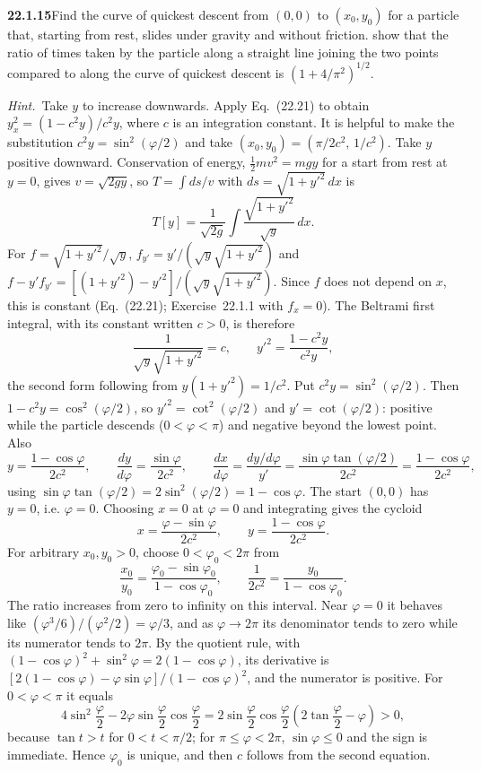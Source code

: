 \par\bigskip
\noindent\textbf{22.1.15}\quad Find the curve of quickest descent
from $(0,0)$ to $(x_{0},y_{0})$ for a particle that, starting
from rest, slides under gravity and without friction.
  show that
the ratio of times taken by the particle along a straight line
joining the two points compared to along the curve of quickest
descent is $(1+4/\pi^{2})^{1/2}$.
\par\emph{Hint.}~Take $y$ to increase downwards. Apply
Eq.~(22.21) to obtain $y_{x}^{2}=(1-c^{2}y)/c^{2}y$, where $c$ is
an integration constant. It is helpful to make the substitution
$c^{2}y=\sin^{2}(\varphi/2)$ and take
$(x_{0},y_{0})=(\pi/2c^{2},\,1/c^{2})$.
\solution
Take $y$ positive downward. Conservation of energy,
$\tfrac12mv^2=mgy$ for a start from rest at $y=0$, gives
$v=\sqrt{2gy}$, so $T=\int ds/v$ with $ds=\sqrt{1+y'^2}\,dx$ is
\[
T[y]=\frac1{\sqrt{2g}}\int
\frac{\sqrt{1+y'^2}}{\sqrt y}\,dx.
\]
For $f=\sqrt{1+y'^2}/\sqrt y$, $f_{y'}=y'/(\sqrt y\sqrt{1+y'^2})$ and
$f-y'f_{y'}=[(1+y'^2)-y'^2]/(\sqrt y\sqrt{1+y'^2})$. Since $f$ does not
depend on $x$, this is constant (Eq.~(22.21); Exercise~22.1.1 with
$f_x=0$). The Beltrami first integral, with its constant written
$c>0$, is therefore
\[
\frac1{\sqrt y\sqrt{1+y'^2}}=c,\qquad
y'^2=\frac{1-c^2y}{c^2y},
\]
the second form following from $y(1+y'^2)=1/c^2$.
Put $c^2y=\sin^2(\varphi/2)$. Then $1-c^2y=\cos^2(\varphi/2)$, so
$y'^2=\cot^2(\varphi/2)$ and $y'=\cot(\varphi/2)$: positive while the
particle descends ($0<\varphi<\pi$) and negative beyond the lowest
point. Also
\[
y=\frac{1-\cos\varphi}{2c^2},\qquad
\frac{dy}{d\varphi}=\frac{\sin\varphi}{2c^2},\qquad
\frac{dx}{d\varphi}=\frac{dy/d\varphi}{y'}
=\frac{\sin\varphi\tan(\varphi/2)}{2c^2}
=\frac{1-\cos\varphi}{2c^2},
\]
using $\sin\varphi\tan(\varphi/2)=2\sin^2(\varphi/2)=1-\cos\varphi$.
The start $(0,0)$ has $y=0$, i.e. $\varphi=0$. Choosing $x=0$ at
$\varphi=0$ and integrating gives the cycloid
\[
\boxed{x=\frac{\varphi-\sin\varphi}{2c^2},\qquad
y=\frac{1-\cos\varphi}{2c^2}}.
\]
For arbitrary $x_0,y_0>0$, choose $0<\varphi_0<2\pi$ from
\[
\frac{x_0}{y_0}
=\frac{\varphi_0-\sin\varphi_0}{1-\cos\varphi_0},
\qquad
\frac1{2c^2}=\frac{y_0}{1-\cos\varphi_0}.
\]
The ratio increases from zero to infinity on this interval. Near
$\varphi=0$ it behaves like $(\varphi^3/6)/(\varphi^2/2)=\varphi/3$, and
as $\varphi\to2\pi$ its denominator tends to zero while its numerator
tends to $2\pi$. By the quotient rule, with
$(1-\cos\varphi)^2+\sin^2\varphi=2(1-\cos\varphi)$, its derivative
is $[2(1-\cos\varphi)-\varphi\sin\varphi]/(1-\cos\varphi)^2$, and the
numerator is positive. For $0<\varphi<\pi$ it equals
\[
4\sin^2\frac\varphi2-2\varphi\sin\frac\varphi2\cos\frac\varphi2
=2\sin\frac\varphi2\cos\frac\varphi2
\left(2\tan\frac\varphi2-\varphi\right)>0,
\]
because $\tan t>t$ for $0<t<\pi/2$; for $\pi\le\varphi<2\pi$,
$\sin\varphi\le0$ and the sign is immediate. Hence $\varphi_0$ is
unique, and then $c$ follows from the second equation.

